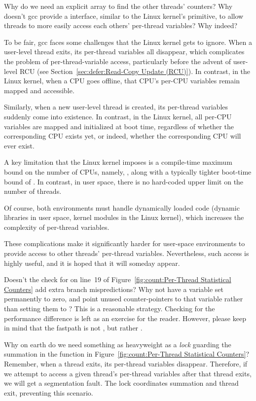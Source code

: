 \QuickQ{}
	Why do we need an explicit array to find the other threads'
	counters?
	Why doesn't gcc provide a  interface, similar
	to the Linux kernel's  primitive, to allow
	threads to more easily access each others' per-thread variables?
\QuickA{}
	Why indeed?

	To be fair, gcc faces some challenges that the Linux kernel
	gets to ignore.
	When a user-level thread exits, its per-thread variables all
	disappear, which complicates the problem of per-thread-variable
	access, particularly before the advent of user-level RCU
	(see Section~\ref{sec:defer:Read-Copy Update (RCU)}).
	In contrast, in the Linux kernel, when a CPU goes offline,
	that CPU's per-CPU variables remain mapped and accessible.

	Similarly, when a new user-level thread is created, its
	per-thread variables suddenly come into existence.
	In contrast, in the Linux kernel, all per-CPU variables are
	mapped and initialized at boot time, regardless of whether
	the corresponding CPU exists yet, or indeed, whether the
	corresponding CPU will ever exist.

	A key limitation that the Linux kernel imposes is a compile-time
	maximum bound on the number of CPUs, namely, ,
	along with a typically tighter boot-time bound of .
	In contrast, in user space, there is no hard-coded upper limit
	on the number of threads.

	Of course, both environments must handle dynamically loaded
	code (dynamic libraries in user space, kernel modules in the
	Linux kernel), which increases the complexity of per-thread
	variables.

	These complications make it significantly harder for user-space
	environments to provide access to other threads' per-thread
	variables.
	Nevertheless, such access is highly useful, and it is hoped
	that it will someday appear.

\QuickQ{}
	Doesn't the check for  on line~19 of
	Figure~\ref{fig:count:Per-Thread Statistical Counters}
	add extra branch mispredictions?
	Why not have a variable set permanently to zero, and point
	unused counter-pointers to that variable rather than setting
	them to ?
\QuickA{}
	This is a reasonable strategy.
	Checking for the performance difference is left as an exercise
	for the reader.
	However, please keep in mind that the fastpath is not
	, but rather .

\QuickQ{}
	Why on earth do we need something as heavyweight as a \emph{lock}
	guarding the summation in the function  in
	Figure~\ref{fig:count:Per-Thread Statistical Counters}?
\QuickA{}
	Remember, when a thread exits, its per-thread variables disappear.
	Therefore, if we attempt to access a given thread's per-thread
	variables after that thread exits, we will get a segmentation
	fault.
	The lock coordinates summation and thread exit, preventing this
	scenario.

